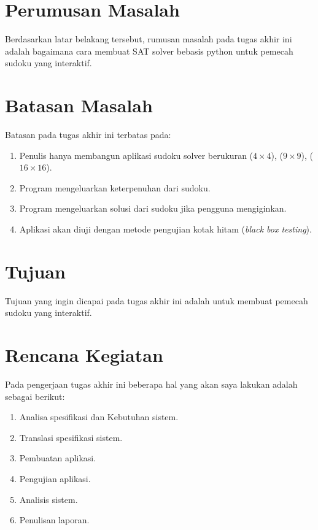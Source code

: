 \section{Perumusan Masalah}

Berdasarkan latar belakang tersebut, rumusan masalah pada tugas akhir ini
adalah bagaimana cara membuat SAT solver bebasis python untuk pemecah sudoku yang interaktif.

\section{Batasan Masalah}

Batasan pada tugas akhir ini terbatas pada:
\begin{enumerate}
	\item Penulis hanya membangun aplikasi sudoku solver berukuran ($4\times4$), ($9\times9$), ($16\times16$).
	\item Program mengeluarkan keterpenuhan dari sudoku.
	\item Program mengeluarkan solusi dari sudoku jika pengguna mengiginkan.
	\item Aplikasi akan diuji dengan metode
	pengujian kotak hitam (\textit{black box testing}).
\end{enumerate}

\section{Tujuan}

Tujuan yang ingin dicapai pada tugas akhir ini adalah untuk membuat pemecah sudoku yang interaktif.

\section{Rencana Kegiatan}

Pada pengerjaan tugas akhir ini beberapa hal yang akan saya lakukan adalah sebagai berikut:
\begin{enumerate}
	\item Analisa spesifikasi dan Kebutuhan sistem.
	\item Translasi spesifikasi sistem.
	\item Pembuatan aplikasi.
	\item Pengujian aplikasi.
	\item Analisis sistem.
	\item Penulisan laporan.
	
\end{enumerate}

